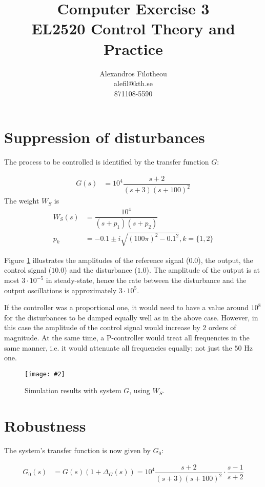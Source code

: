 \documentclass[a4paper,12pt,oneside,onecolumn]{article} %
\title{
	Computer Exercise 3\\
	EL2520 Control Theory and Practice
}
\author{
  Alexandros Filotheou \\
  alefil@kth.se \\
  871108-5590
}
\newcommand{\imageg}[3][width=1.0\columnwidth]{
	\begin{figure}[H]
		\centering
	    \texttt{[image: \#2]}
		\caption{#3}
		\label{fig:#2}
	\end{figure}
}
\begin{document}
	\maketitle

	\section*{Suppression of disturbances}

  The process to be controlled is identified by the transfer function $G$:

  \begin{align*}
    G(s) &= 10^4 \dfrac{s+2}{(s+3)(s+100)^2}
  \end{align*}
	The weight $W_S$ is
	\begin{align*}
    W_S(s) &= \dfrac{10^4}{(s+p_1)(s+p_2)}  \\
    p_k &= -0.1 \pm i\sqrt{(100\pi)^2 - 0.1^2}, k = \{1,2\}
	\end{align*}

  Figure \ref{fig:figures/macro_1.pdf} illustrates the amplitudes of the reference
  signal ($0.0$), the output, the control signal ($10.0$) and the disturbance
  ($1.0$). The amplitude of the output is at most $3\cdot10^{-5}$
  in steady-state, hence the rate between the disturbance and the output
  oscillations is approximately $3\cdot10^5$.

  If the controller was a proportional one, it would need to have a value around
  $10^8$ for the disturbances to be damped equally well as in the above case.
  However, in this case the amplitude of the control signal would increase by
  $2$ orders of magnitude. At the same time, a P-controller would treat all
  frequencies in the same manner, i.e. it would attenuate all frequencies
  equally; not just the $50$ Hz one.

  \imageg{figures/macro_1.pdf}{Simulation results with system $G$, using $W_S$.}

  \newpage

	\section*{Robustness}

  The system's transfer function is now given by $G_0$:

  \begin{align*}
    G_0(s) &= G(s)(1+\Delta_G(s)) = 10^4 \dfrac{s+2}{(s+3)(s+100)^2} \cdot \dfrac{s-1}{s+2}
  \end{align*}
\end{document}
